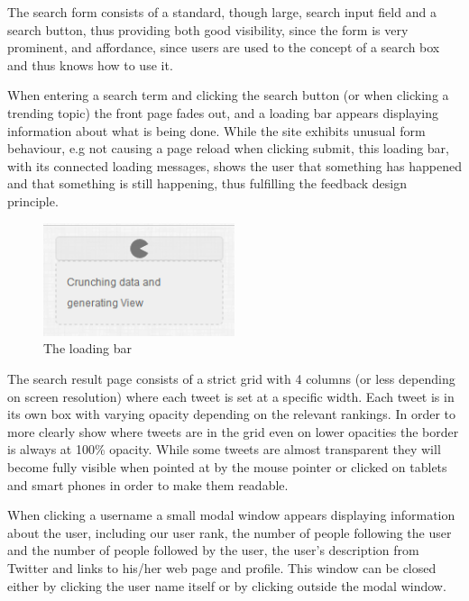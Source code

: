 The search form consists of a standard, though large, search input field and a search button, thus providing both good visibility, since the form is very prominent, and affordance, since users are used to the concept of a search box and thus knows how to use it.

When entering a search term and clicking the search button (or when clicking a trending topic) the front page fades out, and a loading bar appears displaying information about what is being done. While the site exhibits unusual form behaviour, e.g not causing a page reload when clicking submit, this loading bar, with its connected loading messages, shows the user that something has happened and that something is still happening, thus fulfilling the feedback design principle.

\begin{figure}[ht]
    \begin{minipage}[b]{1\linewidth}
        \centering
        \includegraphics[width=0.5\textwidth]{figures/feedjam_loading}
        \caption{The loading bar}
        \label{fig:FeedJamLoading}
    \end{minipage}
\end{figure}


The search result page consists of a strict grid with 4 columns (or less depending on screen resolution) where each tweet is set at a specific width. Each tweet is in its own box with varying opacity depending on the relevant rankings. In order to more clearly show where tweets are in the grid even on lower opacities the border is always at 100\% opacity. While some tweets are almost transparent they will become fully visible when pointed at by the mouse pointer or clicked on tablets and smart phones in order to make them readable.

When clicking a username a small modal window appears displaying information about the user, including our user rank, the number of people following the user and the number of people followed by the user, the user's description from Twitter and links to his/her web page and profile. This window can be closed either by clicking the user name itself or by clicking outside the modal window.


